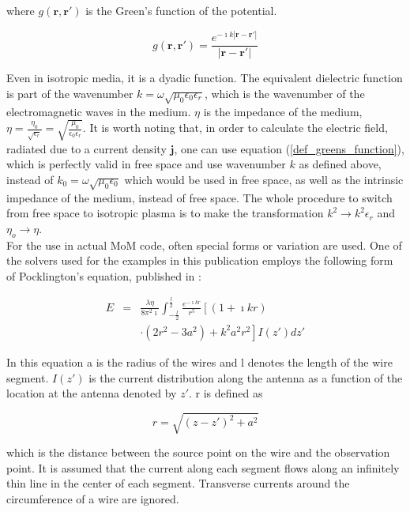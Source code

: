 \documentclass[draft,ras]{agutex}
\begin{document}
\begin{article}
where $g(\mathbf{r},\mathbf{r'})$ is the Green's function of the potential.

\begin{equation}\label{eq:greens_func_vac}
    g(\mathbf{r},\mathbf{r'})= \frac{e^{- \imath k  | \mathbf{r}-\mathbf{r'} |}}{| \mathbf{r}-\mathbf{r'} |}
\end{equation}

Even in isotropic media, it is a dyadic function. The equivalent dielectric function is part of the wavenumber $k=\omega \sqrt{\mu_0 \epsilon_0 \epsilon_r}$, which is the wavenumber of the electromagnetic waves in the medium. $\eta$ is the impedance of the medium, $\eta=\frac{\eta_0}{\sqrt{\epsilon_r}}=\sqrt{\frac{\mu_0}{\epsilon_0\epsilon_r}}$. It is worth noting that, in order to calculate the electric field, radiated due to a current density $\mathbf{j}$, one can use equation (\ref{def_greens_function}), which is perfectly valid in free space and use wavenumber $k$ as defined above, instead of $k_0=\omega \sqrt{\mu_0 \epsilon_0}$ which would be used in free space, as well as the intrinsic impedance of the medium, instead of free space. The whole procedure to switch from free space to isotropic plasma is to make the transformation $k^2 \rightarrow k^2\epsilon_r$ and $\eta_o \rightarrow \eta$.\\

For the use in actual MoM code, often special forms or variation are used. One of the solvers used for the examples in this publication employs the following form of Pocklington's equation, published in \cite{richmond66}:

\begin{eqnarray}\label{eq:pocklington}
E&=&\frac{\lambda \eta}{8 \pi^2 \imath} \int_{-\frac{l}{2}}^{\frac{l}{2}} \frac{e^{-\imath k r}}{r^5} \left[ (1+\imath k r)\right.  \\
&&\left.  \cdot (2 r^2-3a^2)+k^2a^2r^2\right]I(z') dz'\nonumber
\end{eqnarray}

In this equation a is the radius of the wires and l denotes the length of the wire segment. $I(z')$ is the current distribution along the antenna as a function of the location at the antenna denoted by $z'$. r is defined as

\begin{equation}
 r=\sqrt{(z-z')^2+a^2}
\end{equation}

which is the distance between the source point on the wire and the observation point. It is assumed that the current along each segment flows along an infinitely thin line in the center of each segment. Transverse currents around the circumference of a wire are ignored.\\


\end{article}
\end{document}
